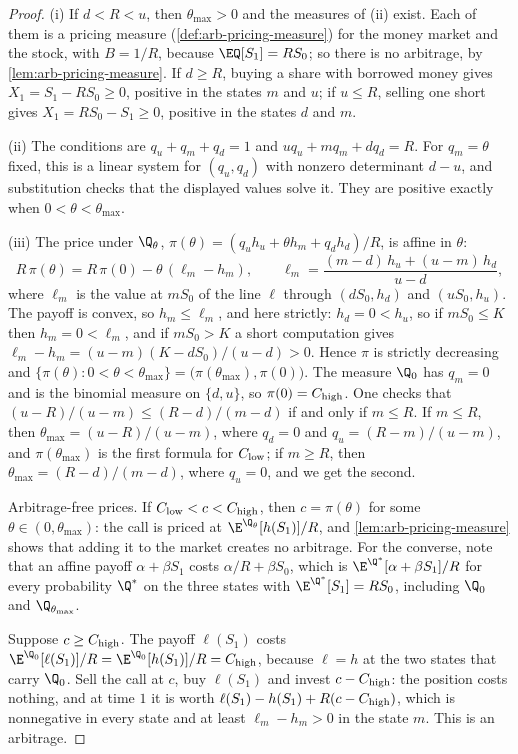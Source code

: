\begin{proof}
(i) If $d<R<u$, then $\theta_{\max}>0$ and the measures of (ii) exist. Each of them is a
pricing measure (\cref{def:arb-pricing-measure}) for the money market and the stock, with
$B=1/R$, because $\EQ[S_1]=RS_0$; so there is no arbitrage, by
\cref{lem:arb-pricing-measure}. If $d\ge R$, buying a share with borrowed money
gives $X_1=S_1-RS_0\ge0$, positive in the states $m$ and $u$; if $u\le R$, selling one
short gives $X_1=RS_0-S_1\ge0$, positive in the states $d$ and $m$.

(ii) The conditions are $q_u+q_m+q_d=1$ and $uq_u+mq_m+dq_d=R$. For $q_m=\theta$ fixed,
this is a linear system for $(q_u,q_d)$ with nonzero determinant $d-u$, and substitution
checks that the displayed values solve it. They are positive exactly when
$0<\theta<\theta_{\max}$.

(iii) The price under $\Q_\theta$, $\pi(\theta)=(q_uh_u+\theta h_m+q_dh_d)/R$, is affine
in $\theta$:
\[
  R\,\pi(\theta)=R\,\pi(0)-\theta\,(\ell_m-h_m),\qquad
  \ell_m=\frac{(m-d)\,h_u+(u-m)\,h_d}{u-d},
\]
where $\ell_m$ is the value at $mS_0$ of the line $\ell$ through $(dS_0,h_d)$ and
$(uS_0,h_u)$. The payoff is convex, so $h_m\le\ell_m$, and here strictly: $h_d=0<h_u$, so
if $mS_0\le K$ then $h_m=0<\ell_m$, and if $mS_0>K$ a short computation gives
$\ell_m-h_m=(u-m)(K-dS_0)/(u-d)>0$. Hence $\pi$ is strictly decreasing and
$\{\pi(\theta):0<\theta<\theta_{\max}\}=\big(\pi(\theta_{\max}),\pi(0)\big)$. The
measure $\Q_0$ has $q_m=0$ and is the binomial measure on $\{d,u\}$, so
$\pi(0)=C_{\rm high}$. One checks that $(u-R)/(u-m)\le(R-d)/(m-d)$ if and only if
$m\le R$. If $m\le R$, then $\theta_{\max}=(u-R)/(u-m)$, where $q_d=0$ and
$q_u=(R-m)/(u-m)$, and $\pi(\theta_{\max})$ is the first formula for $C_{\rm low}$; if
$m\ge R$, then $\theta_{\max}=(R-d)/(m-d)$, where $q_u=0$, and we get the second.

Arbitrage-free prices. If $C_{\rm low}<c<C_{\rm high}$, then $c=\pi(\theta)$ for some
$\theta\in(0,\theta_{\max})$: the call is priced at $\E^{\Q_\theta}[h(S_1)]/R$, and
\cref{lem:arb-pricing-measure} shows that adding it to the market creates no arbitrage. For
the converse, note that an affine payoff $\alpha+\beta S_1$ costs $\alpha/R+\beta S_0$, which
is $\E^{\Q^*}[\alpha+\beta S_1]/R$ for every probability $\Q^*$ on the three states with
$\E^{\Q^*}[S_1]=RS_0$, including $\Q_0$ and $\Q_{\theta_{\max}}$.

Suppose $c\ge C_{\rm high}$. The payoff $\ell(S_1)$ costs
$\E^{\Q_0}[\ell(S_1)]/R=\E^{\Q_0}[h(S_1)]/R=C_{\rm high}$, because $\ell=h$ at the two
states that carry $\Q_0$. Sell the call at $c$, buy $\ell(S_1)$ and invest
$c-C_{\rm high}$: the position costs nothing, and at time $1$ it is worth
$\ell(S_1)-h(S_1)+R(c-C_{\rm high})$, which is nonnegative in every state and at least
$\ell_m-h_m>0$ in the state $m$. This is an arbitrage.


\end{proof}
